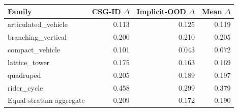 \begin{tabular}{@{}lrrr@{}}
\toprule
Family & CSG-ID $\Delta$ & Implicit-OOD $\Delta$ & Mean $\Delta$ \\
\midrule
articulated\_vehicle & 0.113 & 0.125 & 0.119 \\
branching\_vertical & 0.200 & 0.210 & 0.205 \\
compact\_vehicle & 0.101 & 0.043 & 0.072 \\
lattice\_tower & 0.175 & 0.163 & 0.169 \\
quadruped & 0.205 & 0.189 & 0.197 \\
rider\_cycle & 0.458 & 0.299 & 0.379 \\
\midrule
Equal-stratum aggregate & 0.209 & 0.172 & 0.190 \\
\bottomrule
\end{tabular}
